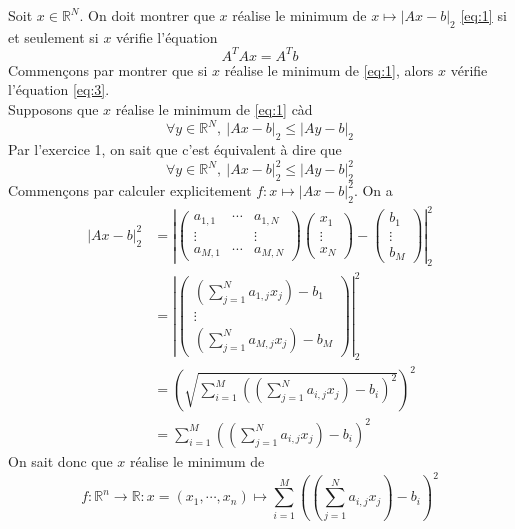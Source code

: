 \documentclass[a4paper, 10pt]{article}
\newcommand{\IR}{\mathbb{R}}
\begin{document}
Soit \( x \in \IR^N \). On doit montrer que \( x \) réalise le minimum de \( x \mapsto |Ax - b|_2 \) \eqref{eq:1} si et seulement si \( x \) vérifie l'équation
\begin{equation}
    \label{eq:3}
    A^T A x = A^T b
\end{equation}
Commençons par montrer que si \( x \) réalise le minimum de \eqref{eq:1}, alors \( x \) vérifie l'équation \eqref{eq:3}. \\
Supposons que \( x \) réalise le minimum de \eqref{eq:1} càd
$$
\forall y \in \IR^N,~ |Ax - b|_2 \leq |Ay - b|_2
$$
Par l'exercice 1, on sait que c'est équivalent à dire que
$$
\forall y \in \IR^N,~ |Ax - b|_2^2 \leq |Ay - b|_2^2
$$
Commençons par calculer explicitement \( f : x \mapsto |Ax - b|_2^2 \). On a
\begin{align*}
    |Ax - b|_2^2
    & = \left|
        \begin{pmatrix}
        a_{1, 1} & \cdots & a_{1, N} \\
        \vdots   &        & \vdots \\
        a_{M, 1} & \cdots & a_{M, N}
        \end{pmatrix}
        \begin{pmatrix}
        x_1 \\
        \vdots \\
        x_N
        \end{pmatrix}
        -
        \begin{pmatrix}
        b_1 \\
        \vdots \\
        b_M
        \end{pmatrix}
        \right|_2^2 \\
    & = \left|
        \begin{pmatrix}
        \displaystyle \left( \sum_{j = 1}^N a_{1, j} x_j \right) - b_1 \\
        \vdots \\
        \displaystyle \left( \sum_{j = 1}^N a_{M, j} x_j \right) - b_M
        \end{pmatrix}
        \right|_2^2 \\
    & = \left( \sqrt{\sum_{i = 1}^M \left( \left( \sum_{j = 1}^N a_{i, j} x_j \right) - b_i \right)^2} \right)^2 \\
    & = \sum_{i = 1}^M \left( \left( \sum_{j = 1}^N a_{i, j} x_j \right) - b_i \right)^2
\end{align*}
On sait donc que \( x \) réalise le minimum de
$$
f : \IR^n \to \IR : x = (x_1, \cdots, x_n) \mapsto \sum_{i = 1}^M \left( \left( \sum_{j = 1}^N a_{i, j} x_j \right) - b_i \right)^2
$$
\end{document}
